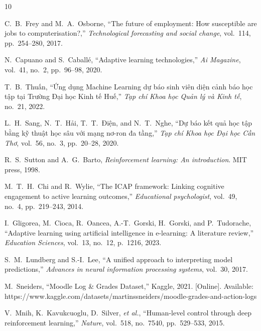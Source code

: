\documentclass[9pt, conference, a4paper, compsocconf]{IEEEtran}
\begin{document}
\begin{thebibliography}{10}

C.~B.~Frey and M.~A.~Osborne, ``The future of employment: How susceptible are jobs to computerisation?,'' \textit{Technological forecasting and social change}, vol.~114, pp.~254--280, 2017.

N.~Capuano and S.~Caball\'e, ``Adaptive learning technologies,'' \textit{Ai Magazine}, vol.~41, no.~2, pp.~96--98, 2020.

T.~B.~Thuấn, ``Ứng dụng Machine Learning dự báo sinh viên diện cảnh báo học tập tại Trường Đại học Kinh tế Huế,'' \textit{Tạp chí Khoa học Quản lý và Kinh tế}, no.~21, 2022.

L.~H.~Sang, N.~T.~Hải, T.~T.~Điện, and N.~T.~Nghe, ``Dự báo kết quả học tập bằng kỹ thuật học sâu với mạng nơ-ron đa tầng,'' \textit{Tạp chí Khoa học Đại học Cần Thơ}, vol.~56, no.~3, pp.~20--28, 2020.

R.~S.~Sutton and A.~G.~Barto, \textit{Reinforcement learning: An introduction}. MIT press, 1998.

M.~T.~H.~Chi and R.~Wylie, ``The ICAP framework: Linking cognitive engagement to active learning outcomes,'' \textit{Educational psychologist}, vol.~49, no.~4, pp.~219--243, 2014.

I.~Gligorea, M.~Cioca, R.~Oancea, A.-T.~Gorski, H.~Gorski, and P.~Tudorache, ``Adaptive learning using artificial intelligence in e-learning: A literature review,'' \textit{Education Sciences}, vol.~13, no.~12, p.~1216, 2023.

S.~M.~Lundberg and S.-I.~Lee, ``A unified approach to interpreting model predictions,'' \textit{Advances in neural information processing systems}, vol.~30, 2017.

M.~Sneiders, ``Moodle Log \& Grades Dataset,'' Kaggle, 2021. [Online]. Available: https://www.kaggle.com/datasets/martinssneiders/moodle-grades-and-action-logs

V.~Mnih, K.~Kavukcuoglu, D.~Silver, \textit{et al.}, ``Human-level control through deep reinforcement learning,'' \textit{Nature}, vol.~518, no.~7540, pp.~529--533, 2015.

\end{thebibliography}
\end{document}
